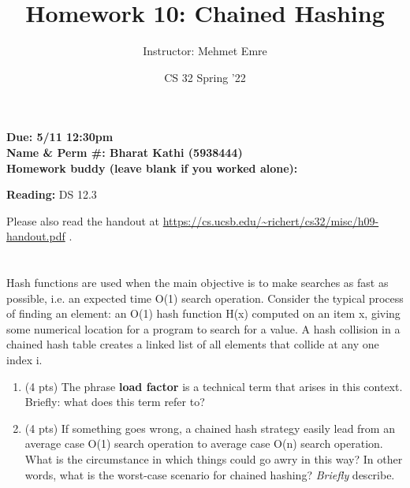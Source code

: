 \documentclass[11pt]{article}
\author{Instructor: Mehmet Emre}
\date{CS 32 Spring '22}
\title{Homework 10: Chained Hashing}
\begin{document}
\maketitle
\textbf{Due: 5/11 12:30pm} \\ 
\vspace{1em}
\textbf{Name \& Perm \#: Bharat Kathi (5938444)} \\ 
\textbf{Homework buddy (leave blank if you worked alone):}

\textbf{Reading:} DS 12.3

Please also read the handout at
\url{https://cs.ucsb.edu/\~richert/cs32/misc/h09-handout.pdf} . 

\section{}
\label{sec:orgfd34428}
Hash functions are used when the main objective is to make searches as fast as
possible, i.e. an expected time O(1) search operation. Consider the typical
process of finding an element: an O(1) hash function H(x) computed on an item
x, giving some numerical location for a program to search for a value. A hash
collision in a chained hash table creates a linked list of all elements that
collide at any one index i.
\begin{enumerate}
\item (4 pts) The phrase \textbf{load factor} is a technical term that arises in
this context. Briefly: what does this term refer to?
\vspace{12em}
\item (4 pts) If something goes wrong, a chained hash strategy easily lead from an
average case O(1) search operation to average case O(n) search
operation. What is the circumstance in which things could go awry in this
way? In other words, what is the worst-case scenario for chained hashing?
\emph{Briefly} describe.
\vspace{12em}
\end{enumerate}

\newpage
\end{document}
